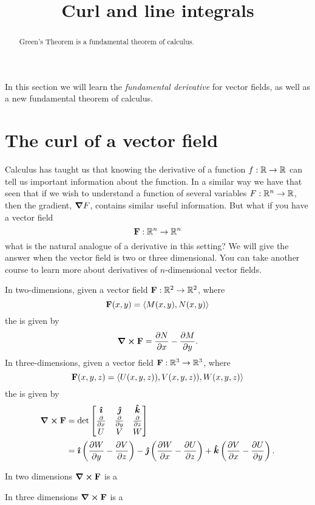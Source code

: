 \documentclass{ximera}
\title[Dig-In:]{Curl and line integrals}
\begin{document}
\begin{abstract}
Green's Theorem is a fundamental theorem of calculus.
\end{abstract}
\maketitle

In this section we will learn the \textit{fundamental derivative} for
vector fields, as well as a new fundamental theorem of calculus.


\section{The curl of a vector field}

Calculus has taught us that knowing the derivative of a function
$f:\R\to\R$ can tell us important information about the function.  In
a similar way we have that seen that if we wish to understand a
function of several variables $F:\R^n\to\R$, then the gradient, $\grad
F$, contains similar useful information. But what if you have a vector
field
\[
\vec{F}:\R^n\to\R^n
\]
what is the natural analogue of a derivative in this setting? We will
give the answer when the vector field is two or three dimensional. You
can take another course to learn more about derivatives of
$n$-dimensional vector fields.


\begin{definition}
  In two-dimensions, given a vector field $\vec{F}:\R^2\to \R^2$, where
  \[
  \vec{F}(x,y) = \vector{M(x,y),N(x,y)}
  \]
  the  is given by
  \[
  \curl \vec F = \pp[N]{x}-\pp[M]{y}.
  \]
  In three-dimensions, given a vector field $\vec{F}:\R^3\to\R^3$, where
  \[
  \vec{F}(x,y,z) = \vector{U(x,y,z)),V(x,y,z)),W(x,y,z)}
  \]
  the  is given by
  \begin{align*}
  \curl \vec F &= \det
  \begin{bmatrix}
    \veci & \vecj & \veck \\
    \pp{x} & \pp{y} & \pp{z}\\
    U & V & W
  \end{bmatrix}\\
  &= \veci\left(\pp[W]{y}-\pp[V]{z}\right)-
  \vecj\left(\pp[W]{x}-\pp[U]{z}\right)+
  \veck\left(\pp[V]{x}-\pp[U]{y}\right).
  \end{align*}
\end{definition}

\begin{question}
  In two dimensions $\curl\vec{F}$ is a
  \begin{multipleChoice}
  \end{multipleChoice}
  \begin{question}
    In three dimensions $\curl\vec{F}$ is a
    \begin{multipleChoice}
    \end{multipleChoice}
  \end{question}
\end{question}
\end{document}
